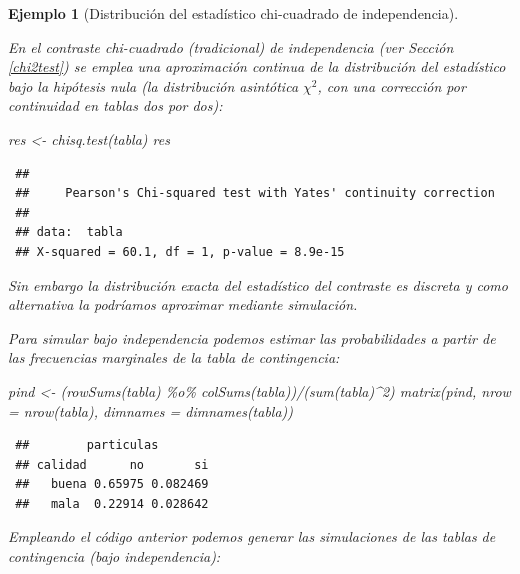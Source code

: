 \documentclass[
  10pt,
]{book}
\newenvironment{Shaded}{\begin{snugshade}}{\end{snugshade}}
\newcommand{\AttributeTok}[1]{\textcolor[rgb]{0.77,0.63,0.00}{#1}}
\newcommand{\DecValTok}[1]{\textcolor[rgb]{0.00,0.00,0.81}{#1}}
\newcommand{\FunctionTok}[1]{\textcolor[rgb]{0.00,0.00,0.00}{#1}}
\newcommand{\NormalTok}[1]{#1}
\newcommand{\OtherTok}[1]{\textcolor[rgb]{0.56,0.35,0.01}{#1}}
\newcommand{\SpecialCharTok}[1]{\textcolor[rgb]{0.00,0.00,0.00}{#1}}
\theoremstyle{break}
\newtheorem{example}{Ejemplo}[chapter]
\theoremstyle{nonumberplain}
\begin{document}
\begin{example}[Distribución del estadístico chi-cuadrado de independencia]
\protect\hypertarget{exm:chicuadind}{}\label{exm:chicuadind}

En el contraste chi-cuadrado (tradicional) de independencia (ver Sección \ref{chi2test}) se emplea una aproximación continua de la distribución del estadístico bajo la hipótesis nula (la distribución asintótica \(\chi^2\), con una corrección por continuidad en tablas dos por dos):

\begin{Shaded}
\begin{Highlighting}[]
\NormalTok{res }\OtherTok{\textless{}{-}} \FunctionTok{chisq.test}\NormalTok{(tabla)}
\NormalTok{res}
\end{Highlighting}
\end{Shaded}

\begin{verbatim}
 ## 
 ##     Pearson's Chi-squared test with Yates' continuity correction
 ## 
 ## data:  tabla
 ## X-squared = 60.1, df = 1, p-value = 8.9e-15
\end{verbatim}

Sin embargo la distribución exacta del estadístico del contraste es discreta y como alternativa la podríamos aproximar mediante simulación.

Para simular bajo independencia podemos estimar las probabilidades a partir de las frecuencias marginales de la tabla de contingencia:

\begin{Shaded}
\begin{Highlighting}[]
\NormalTok{pind }\OtherTok{\textless{}{-}}\NormalTok{ (}\FunctionTok{rowSums}\NormalTok{(tabla) }\SpecialCharTok{\%o\%} \FunctionTok{colSums}\NormalTok{(tabla))}\SpecialCharTok{/}\NormalTok{(}\FunctionTok{sum}\NormalTok{(tabla)}\SpecialCharTok{\^{}}\DecValTok{2}\NormalTok{)}
\FunctionTok{matrix}\NormalTok{(pind, }\AttributeTok{nrow =} \FunctionTok{nrow}\NormalTok{(tabla), }\AttributeTok{dimnames =} \FunctionTok{dimnames}\NormalTok{(tabla))}
\end{Highlighting}
\end{Shaded}

\begin{verbatim}
 ##        particulas
 ## calidad      no       si
 ##   buena 0.65975 0.082469
 ##   mala  0.22914 0.028642
\end{verbatim}

Empleando el código anterior podemos generar las simulaciones de las tablas de contingencia (bajo independencia):


\end{example}
\end{document}
